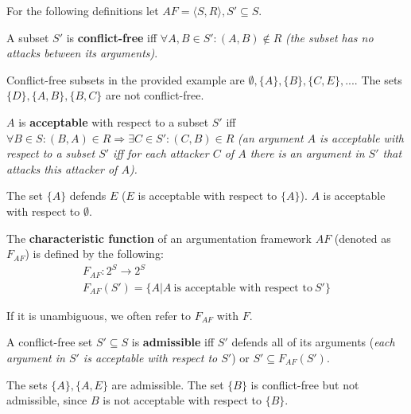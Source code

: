For the following definitions let $AF=\langle S, R \rangle, S' \subseteq S$.

\begin{definition}
 A subset $S'$ is \textbf{conflict-free} iff $ \forall A, B \in S': (A, B) \notin R$ \textit{(the subset has no attacks between its arguments)}.
\end{definition}
\begin{exa}
Conflict-free subsets in the provided example are $\emptyset, \{A\}, \{B\}, \{C, E\}, ...$. The sets $\{D\}, \{A, B\}, \{B, C\}$ are not conflict-free.
\end{exa}

\begin{definition}
$A$ is \textbf{acceptable} with respect to a subset $S'$ iff  $\forall B \in S: (B, A) \in R \Rightarrow \exists C \in S': (C, B) \in R$ \textit{(an argument $A$ is acceptable with respect to a subset $S'$ iff for each attacker $C$ of $A$ there is an argument in $S'$ that attacks this attacker of $A$). }
\end{definition}

\begin{exa}
The set $\{A\}$ defends $E$ ($E$ is acceptable with respect to $\{A\}$). $A$ is acceptable with respect to $\emptyset$.
\end{exa}


\begin{definition}
The \textbf{characteristic function} of an argumentation framework $AF$ (denoted as $F_{AF}$) is defined by the following:
	\begin{align*}
		&F_{AF}: 2^{S} \rightarrow 2^S &\\
		&F_{AF}(S') = \{A | A~\text{is acceptable with respect to}~S'\} &
	\end{align*}
\end{definition}
\begin{notation}
	If it is unambiguous, we often refer to $F_{AF}$ with $F$. 
\end{notation}


\begin{definition}
	A conflict-free set $S' \subseteq S$ is \textbf{admissible} iff $S'$ defends all of its arguments (\textit{each argument in $S'$ is acceptable with respect to $S'$}) or $S' \subseteq F_{AF}(S')$.
\end{definition}

\begin{exa}
The sets $\{A\}, \{A, E\}$ are admissible. The set $\{B\}$ is conflict-free but not admissible, since $B$ is not acceptable with respect to $\{B\}$.
\end{exa}

